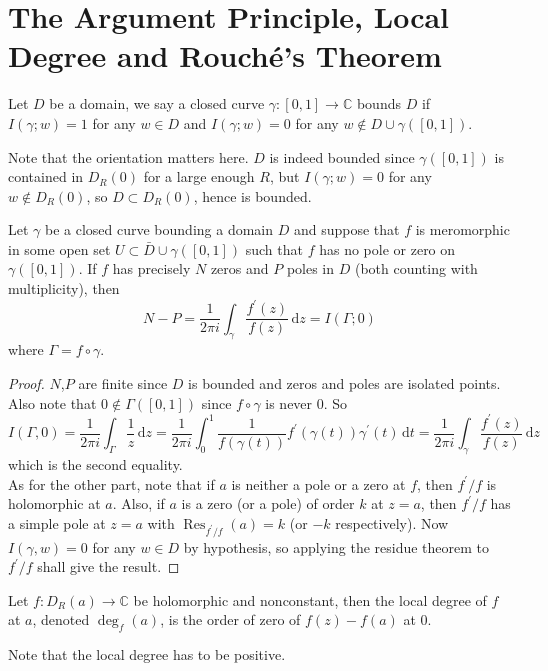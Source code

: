 \section{The Argument Principle, Local Degree and Rouch\'e's Theorem}
\begin{definition}
    Let $D$ be a domain, we say a closed curve $\gamma:[0,1]\to\mathbb C$ bounds $D$ if $I(\gamma;w)=1$ for any $w\in D$ and $I(\gamma;w)=0$ for any $w\notin D\cup\gamma([0,1])$.
\end{definition}
Note that the orientation matters here.
$D$ is indeed bounded since $\gamma([0,1])$ is contained in $D_R(0)$ for a large enough $R$, but $I(\gamma;w)=0$ for any $w\notin D_R(0)$, so $D\subset D_R(0)$, hence is bounded.
\begin{theorem}
    Let $\gamma$ be a closed curve bounding a domain $D$ and suppose that $f$ is meromorphic in some open set $U\subset \bar{D}\cup\gamma([0,1])$ such that $f$ has no pole or zero on $\gamma([0,1])$.
    If $f$ has precisely $N$ zeros and $P$ poles in $D$ (both counting with multiplicity), then
    $$N-P=\frac{1}{2\pi i}\int_\gamma\frac{f^\prime(z)}{f(z)}\,\mathrm dz=I(\Gamma;0)$$
    where $\Gamma=f\circ\gamma$.
\end{theorem}
\begin{proof}
    $N$,$P$ are finite since $D$ is bounded and zeros and poles are isolated points.
    Also note that $0\notin\Gamma([0,1])$ since $f\circ\gamma$ is never $0$.
    So
    $$I(\Gamma,0)=\frac{1}{2\pi i}\int_\Gamma\frac{1}{z}\,\mathrm dz=\frac{1}{2\pi i}\int_0^1\frac{1}{f(\gamma(t))}f^\prime(\gamma(t))\gamma^\prime(t)\,\mathrm dt=\frac{1}{2\pi i}\int_\gamma\frac{f^\prime(z)}{f(z)}\,\mathrm dz$$
    which is the second equality.\\
    As for the other part, note that if $a$ is neither a pole or a zero at $f$, then $f^\prime/f$ is holomorphic at $a$.
    Also, if $a$ is a zero (or a pole) of order $k$ at $z=a$, then $f^\prime/f$ has a simple pole at $z=a$ with $\operatorname{Res}_{f^\prime/f}(a)=k$ (or $-k$ respectively).
    Now $I(\gamma,w)=0$ for any $w\in D$ by hypothesis, so applying the residue theorem to $f^\prime/f$ shall give the result.
\end{proof}
\begin{definition}
    Let $f:D_R(a)\to\mathbb C$ be holomorphic and nonconstant, then the local degree of $f$ at $a$, denoted $\deg_f(a)$, is the order of zero of $f(z)-f(a)$ at $0$.
\end{definition}
Note that the local degree has to be positive.
